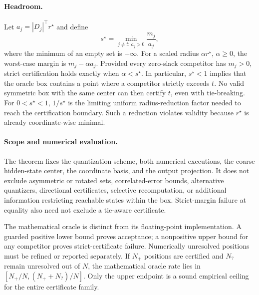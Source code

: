 \paragraph{Headroom.}
Let $a_j=|D_j|^\top r^\star$ and define
\begin{equation}
    s^\star=\min_{j\neq t:\,a_j>0}\frac{m_j}{a_j},
    \label{eq:headroom}
\end{equation}
where the minimum of an empty set is $+\infty$. For a scaled radius $\alpha r^\star$, $\alpha\geq0$, the worst-case margin is $m_j-\alpha a_j$. Provided every zero-slack competitor has $m_j>0$, strict certification holds exactly when $\alpha<s^\star$. In particular, $s^\star<1$ implies that the oracle box contains a point where a competitor strictly exceeds $t$. No valid symmetric box with the same center can then certify $t$, even with tie-breaking. For $0<s^\star<1$, $1/s^\star$ is the limiting uniform radius-reduction factor needed to reach the certification boundary. Such a reduction violates validity because $r^\star$ is already coordinate-wise minimal.

\paragraph{Scope and numerical evaluation.}
The theorem fixes the quantization scheme, both numerical executions, the coarse hidden-state center, the coordinate basis, and the output projection. It does not exclude asymmetric or rotated sets, correlated-error bounds, alternative quantizers, directional certificates, selective recomputation, or additional information restricting reachable states within the box. Strict-margin failure at equality also need not exclude a tie-aware certificate.

The mathematical oracle is distinct from its floating-point implementation. A guarded positive lower bound proves acceptance; a nonpositive upper bound for any competitor proves strict-certificate failure. Numerically unresolved positions must be refined or reported separately. If $N_+$ positions are certified and $N_?$ remain unresolved out of $N$, the mathematical oracle rate lies in $[N_+/N,(N_++N_?)/N]$. Only the upper endpoint is a sound empirical ceiling for the entire certificate family.
